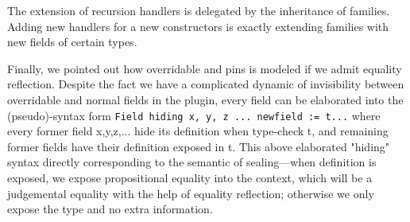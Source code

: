 The extension of recursion handlers is delegated by the inheritance of families. Adding new handlers for a new constructors is exactly extending families with new fields of certain types.  

Finally, we pointed out how overridable and pins is modeled if we admit equality reflection. Despite the fact we have a complicated dynamic of invisibility between overridable and normal fields in the plugin, every field can be elaborated into the (pseudo)-syntax form \texttt{Field hiding {x, y, z ...} newfield := t...}  where every former field x,y,z,...  hide its definition when type-check t, and remaining former fields have their definition exposed in t.
This above elaborated "hiding" syntax directly corresponding to the semantic of sealing---when definition is exposed, we expose propositional equality into the context, which will be a judgemental equality with the help of equality reflection; otherwise we only expose the type and no extra information.
